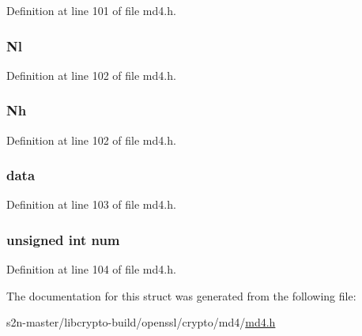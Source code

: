 Definition at line 101 of file md4.\+h.

\subsubsection[{\texorpdfstring{Nl}{Nl}}]{ Nl}\hypertarget{struct_m_d4state__st_ae83bdcbca9d2e71c53489dbfd7f95b1d}{}\label{struct_m_d4state__st_ae83bdcbca9d2e71c53489dbfd7f95b1d}


Definition at line 102 of file md4.\+h.

\subsubsection[{\texorpdfstring{Nh}{Nh}}]{ Nh}\hypertarget{struct_m_d4state__st_a04e4541af84005182d038332d2f9320f}{}\label{struct_m_d4state__st_a04e4541af84005182d038332d2f9320f}


Definition at line 102 of file md4.\+h.

\subsubsection[{\texorpdfstring{data}{data}}]{ data}\hypertarget{struct_m_d4state__st_a5c46fe77de65b3e4102bf31ad378b8df}{}\label{struct_m_d4state__st_a5c46fe77de65b3e4102bf31ad378b8df}


Definition at line 103 of file md4.\+h.

\subsubsection[{\texorpdfstring{num}{num}}]{\setlength{\rightskip}{0pt plus 5cm}unsigned int num}\hypertarget{struct_m_d4state__st_a41ddefd3473727cad32a9767c10faed8}{}\label{struct_m_d4state__st_a41ddefd3473727cad32a9767c10faed8}


Definition at line 104 of file md4.\+h.



The documentation for this struct was generated from the following file\+:\begin{DoxyCompactItemize}
\item 
s2n-\/master/libcrypto-\/build/openssl/crypto/md4/\hyperlink{crypto_2md4_2md4_8h}{md4.\+h}\end{DoxyCompactItemize}
